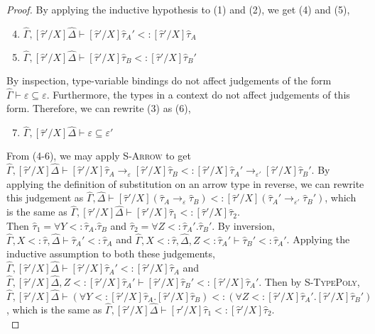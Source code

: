 \documentclass{llncs}
\begin{document}
\begin{proof}
By applying the inductive hypothesis to (1) and (2), we get (4) and (5),

\begin{enumerate}
	\setcounter{enumi}{3}
	\item $\hat \Gamma, [\hat \tau'/X]\hat \Delta \vdash [\hat \tau'/X]\hat \tau_A' <: [\hat \tau'/X]\hat \tau_A$
	\item $\hat \Gamma, [\hat \tau'/X]\hat \Delta \vdash [\hat \tau'/X]\hat \tau_B <: [\hat \tau'/X]\hat \tau_B'$
\end{enumerate}

By inspection, type-variable bindings do not affect judgements of the form $\hat \Gamma \vdash \varepsilon \subseteq \varepsilon$. Furthermore, the types in a context do not affect judgements of this form. Therefore, we can rewrite (3) as (6),

\begin{enumerate}
	\setcounter{enumi}{6}
	\item $\hat \Gamma, [\hat \tau'/X]\hat \Delta \vdash \varepsilon \subseteq \varepsilon'$
\end{enumerate}

From (4-6), we may apply \textsc{S-Arrow} to get $\hat \Gamma, [\hat \tau'/X]\hat \Delta \vdash [\hat \tau'/X]\hat \tau_A \rightarrow_{\varepsilon} [\hat \tau'/X]\hat \tau_B <: [\hat \tau'/X]\hat \tau_A' \rightarrow_{\varepsilon'} [\hat \tau'/X]\hat \tau_B'$. By applying the definition of substitution on an arrow type in reverse, we can rewrite this judgement as $\hat \Gamma, \hat \Delta \vdash [\hat \tau'/X](\hat \tau_A \rightarrow_{\varepsilon} \hat \tau_B) <: [\hat \tau'/X](\hat \tau_A' \rightarrow_{\varepsilon'} \hat \tau_B')$, which is the same as $\hat \Gamma, [\hat \tau'/X]\hat \Delta \vdash [\hat \tau'/X]\hat \tau_1 <: [\hat \tau'/X]\hat \tau_2$. \\

 Then $\hat \tau_1 = \forall Y <: \hat \tau_A. \hat \tau_B$ and $\hat \tau_2 = \forall Z <: \hat \tau_A'. \hat \tau_B'$. By inversion, $\hat \Gamma, X <: \hat \tau, \hat \Delta \vdash \hat \tau_A' <: \hat \tau_A$ and $\hat \Gamma, X <: \hat \tau, \hat \Delta, Z <: \hat \tau_A' \vdash \hat \tau_B' <: \hat \tau_A'$. Applying the inductive assumption to both these judgements, $\hat \Gamma, [\hat \tau'/X]\hat \Delta \vdash [\hat \tau'/X]\hat \tau_A' <: [\hat \tau'/X]\hat \tau_A$ and $\hat \Gamma, [\hat \tau'/X]\hat \Delta, Z <: [\hat \tau'/X]\hat \tau_A' \vdash [\hat \tau'/X]\hat \tau_B' <: [\hat \tau'/X]\hat \tau_A'$. Then by \textsc{S-TypePoly}, $\hat \Gamma, [\hat \tau'/X]\hat \Delta \vdash (\forall Y <: [\hat \tau'/X]\hat \tau_A. [\hat \tau'/X]\hat \tau_B) <: (\forall Z <: [\hat \tau'/X]\hat \tau_A'. [\hat \tau'/X]\hat \tau_B')$, which is the same as $\hat \Gamma, [\hat \tau'/X]\hat \Delta \vdash [\hat \tau'/X]\hat \tau_1 <: [\hat \tau'/X]\hat \tau_2$.\\


\end{proof}
\end{document}

